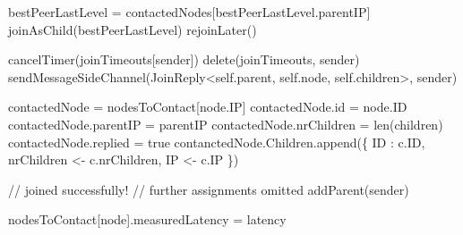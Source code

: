 \begin{algorithm}
\begin{algorithmic}[1]
    \asdupon[JoinRequestTimeout(p)]
        \asdif[p.parentIP != nil]
        \State bestPeerLastLevel = contactedNodes[bestPeerLastLevel.parentIP]
        \State joinAsChild(bestPeerLastLevel)
        \asdelsea
            \State rejoinLater()
        \asdend
    \asdend

        \State cancelTimer(joinTimeouts[sender])
        \State delete(joinTimeouts, sender)
        \State sendMessageSideChannel(JoinReply<self.parent, self.node, self.children>, sender)
    \asdend

        \State contactedNode = nodesToContact[node.IP]
        \State contactedNode.id = node.ID
        \State contactedNode.parentIP = parentIP
        \State contactedNode.nrChildren = len(children)
        \State contactedNode.replied = true
        \asdfor[c in children]
            \State contanctedNode.Children.append(\{ ID : c.ID, nrChildren <- c.nrChildren,
                IP <- c.IP
            \})
        \asdend
    \asdend

        \State // joined successfully! 
        \State // further assignments omitted
        \State addParent(sender)
    \asdend

        \State nodesToContact[node].measuredLatency = latency
    \asdend

    \asdupon[NodeMeasuringFailed(node]{
        \State delete(nodesToContact, node)
    \asdend



}
\end{algorithmic}
\end{algorithm}
